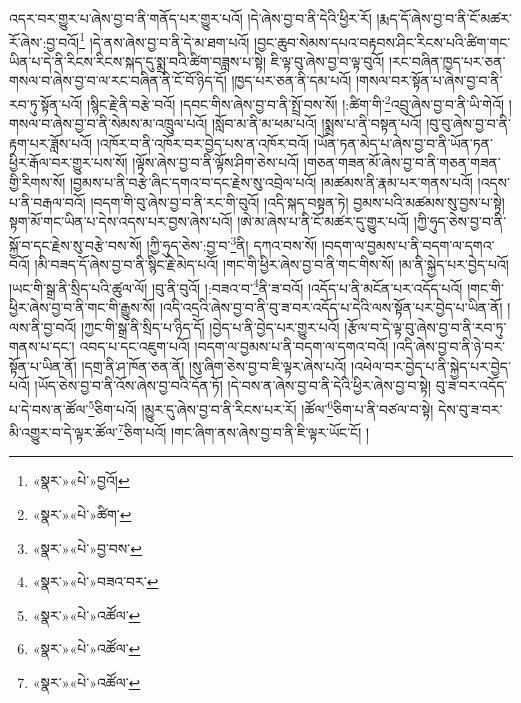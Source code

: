 འདར་བར་གྱུར་པ་ཞེས་བྱ་བ་ནི་གནོད་པར་གྱུར་པའོ། །དེ་ཞེས་བྱ་བ་ནི་དེའི་ཕྱིར་རོ། །རྨད་དོ་ཞེས་བྱ་བ་ནི་ངོ་མཚར་རོ་ཞེས་:བྱ་བའོ།\footnote{«སྣར་»«པེ་»བྱའོ།} །དེ་ནས་ཞེས་བྱ་བ་ནི་དེ་མ་ཐག་པའོ། །བྱང་ཆུབ་སེམས་དཔའ་བརྟབས་ཤིང་རིངས་པའི་ཚིག་གང་ཡིན་པ་དེ་ནི་རིངས་རིངས་སྐད་དུ་སྨྲ་བའི་ཚིག་བཟླས་པ་སྟེ། ཇི་ལྟ་བུ་ཞེས་བྱ་བ་ལྟ་བུའོ། །རང་བཞིན་ཁྱད་པར་ཅན་གསལ་བ་ཞེས་བྱ་བ་ལ་རང་བཞིན་ནི་ངོ་བོ་ཉིད་དོ། །ཁྱད་པར་ཅན་ནི་དམ་པའོ། །གསལ་བར་སྟོན་པ་ཞེས་བྱ་བ་ནི་རབ་ཏུ་སྟོན་པའོ། །སྙིང་རྗེ་ནི་བརྩེ་བའོ། །དབང་གིས་ཞེས་བྱ་བ་ནི་སྤྲོ་བས་སོ། །:ཚིག་གི་\footnote{«སྣར་»«པེ་»ཚིག་}འབྲུ་ཞེས་བྱ་བ་ནི་ཡི་གེའོ། །གསལ་བ་ཞེས་བྱ་བ་ནི་སེམས་མ་འཁྲུལ་པའོ། །སློབ་མ་ནི་མ་ཕམ་པའོ། །སྨྲས་པ་ནི་བསྟན་པའོ། །བུ་བུ་ཞེས་བྱ་བ་ནི་རྟག་པར་ཟློས་པའོ། །འཁོར་བ་ནི་འཁོར་བར་བྱེད་པས་ན་འཁོར་བའོ། །ཡོན་ཏན་མེད་པ་ཞེས་བྱ་བ་ནི་ཡོན་ཏན་ཕྱིར་རྒོལ་བར་གྱུར་པས་སོ། །ལྟོས་ཞེས་བྱ་བ་ནི་ལྟོས་ཤིག་ཅེས་པའོ། །གཅན་གཟན་མོ་ཞེས་བྱ་བ་ནི་གཅན་གཟན་གྱི་རིགས་སོ། །བྱམས་པ་ནི་བརྩེ་ཞིང་དགའ་བ་དང་རྗེས་སུ་འབྲེལ་པའོ། །མཚམས་ནི་རྣམ་པར་གནས་པའོ། །འདས་པ་ནི་བརྒལ་བའོ། །བདག་གི་བུ་ཞེས་བྱ་བ་ནི་རང་གི་བུའོ། །འདི་སྐད་བསྟན་ཏེ། བྱམས་པའི་མཚམས་སུ་བྱས་པ་སྟེ། སྟག་མོ་གང་ཡིན་པ་དེས་འདས་པར་བྱས་ཞེས་པའོ། །ཨེ་མ་ཞེས་པ་ནི་ངོ་མཚར་དུ་གྱུར་པའོ། །ཀྱི་ཧུད་ཅེས་བྱ་བ་ནི་སྐྱོ་བ་དང་རྗེས་སུ་བརྩེ་བས་སོ། །ཀྱི་ཧུད་ཅེས་:བྱ་བ་\footnote{«སྣར་»«པེ་»བྱ་བས་}ནི། དཀའ་བས་སོ། །བདག་ལ་བྱམས་པ་ནི་བདག་ལ་དགའ་བའོ། །མི་བཟད་དོ་ཞེས་བྱ་བ་ནི་སྙིང་རྗེ་མེད་པའོ། །གང་གི་ཕྱིར་ཞེས་བྱ་བ་ནི་གང་གིས་སོ། །མ་ནི་སྐྱེད་པར་བྱེད་པའོ། །ཡང་གི་སྒྲ་ནི་སྲིད་པའི་ཚུལ་ལོ། །བུ་ནི་བུའོ། །:བཟའ་བ་\footnote{«སྣར་»«པེ་»བཟའ་བར་}ནི་ཟ་བའོ། །འདོད་པ་ནི་མངོན་པར་འདོད་པའོ། །གང་གི་ཕྱིར་ཞེས་བྱ་བ་ནི་གང་གི་རྒྱུས་སོ། །འདི་འདྲའི་ཞེས་བྱ་བ་ནི་བུ་ཟ་བར་འདོད་པ་དེའི་ལས་སྟོན་པར་བྱེད་པ་ཡིན་ནོ། །ལས་ནི་བྱ་བའོ། །ཀྱང་གི་སྒྲ་ནི་སྲིད་པ་ཉིད་དོ། །བྱེད་པ་ནི་བྱེད་པར་གྱུར་པའོ། །རྩོལ་བ་དེ་ལྟ་བུ་ཞེས་བྱ་བ་ནི་རབ་ཏུ་གནས་པ་དང་། འབད་པ་དང་འཇུག་པའོ། །བདག་ལ་བྱམས་པ་ནི་བདག་ལ་དགའ་བའོ། །འདི་ཞེས་བྱ་བ་ནི་ཉེ་བར་སྟོན་པ་ཡིན་ནོ། །དགྲ་ནི་ཤ་ཁོན་ཅན་ནོ། །སུ་ཞིག་ཅེས་བྱ་བ་ཇི་ལྟར་ཞེས་པའོ། །འཕེལ་བར་བྱེད་པ་ནི་སྐྱེད་པར་བྱེད་པའོ། །ཡོད་ཅེས་བྱ་བ་ནི་འོས་ཞེས་བྱ་བའི་དོན་ཏོ། །དེ་བས་ན་ཞེས་བྱ་བ་ནི་དེའི་ཕྱིར་ཞེས་བྱ་བ་སྟེ། བུ་ཟ་བར་འདོད་པ་དེ་བས་ན་ཚོལ་\footnote{«སྣར་»«པེ་»འཚོལ་}ཅིག་པའོ། །མྱུར་དུ་ཞེས་བྱ་བ་ནི་རིངས་པར་རོ། །ཚོལ་\footnote{«སྣར་»«པེ་»འཚོལ་}ཅིག་པ་ནི་བཙལ་བ་སྟེ། དེས་བུ་ཟ་བར་མི་འགྱུར་བ་དེ་ལྟར་ཚོལ་\footnote{«སྣར་»«པེ་»འཚོལ་}ཅིག་པའོ། །གང་ཞིག་ནས་ཞེས་བྱ་བ་ནི་ཇི་ལྟར་ཡོང་ངོ། །
